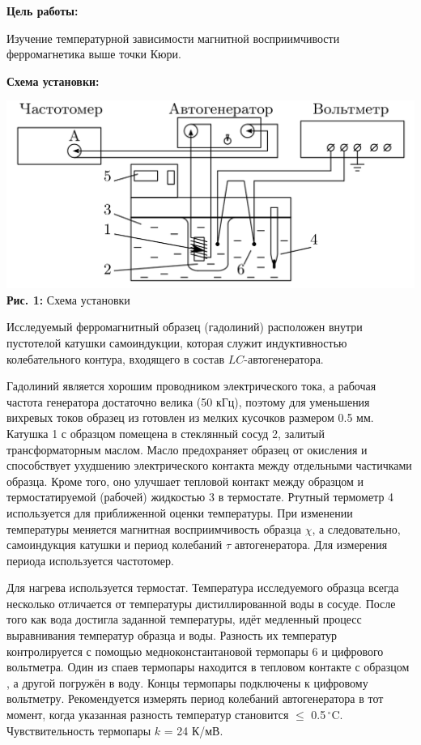 \documentclass[12pt,a4paper]{scrartcl}
\begin{document}
	\textbf{Цель работы: }
	
	Изучение температурной зависимости магнитной восприимчивости ферромагнетика выше точки Кюри.
	
	\textbf{Схема установки:}
	\begin{center}
		\includegraphics[scale=0.32]{PIC_1}
		\\\textbf{Рис. 1:} Схема установки
	\end{center}	
		
	Исследуемый ферромагнитный образец (гадолиний) расположен внутри пустотелой катушки самоиндукции, которая служит индуктивностью колебательного контура, входящего в состав $LC$-автогенератора.
	
	Гадолиний является хорошим проводником электрического тока, а рабочая частота генератора достаточно велика (50 кГц), поэтому для уменьшения вихревых токов образец из готовлен
	из мелких кусочков размером 0.5 мм. Катушка 1 с образцом помещена в стеклянный сосуд 2,
	залитый трансформаторным маслом. Масло предохраняет образец от окисления и способствует ухудшению электрического контакта между отдельными частичками образца. Кроме того,
	оно улучшает тепловой контакт между образцом и термостатируемой (рабочей) жидкостью 3 в
	термостате. Ртутный термометр 4 используется для приближенной оценки температуры. При
	изменении температуры меняется магнитная восприимчивость образца $\chi$, а следовательно, самоиндукция катушки и период колебаний $\tau$ автогенератора. Для измерения периода используется частотомер.
	
	Для нагрева используется термостат. Температура исследуемого образца всегда несколько
	отличается от температуры дистиллированной воды в сосуде. После того как вода достигла
	заданной температуры, идёт медленный процесс выравнивания температур образца и воды.
	Разность их температур контролируется с помощью медноконстантановой термопары 6 и цифрового вольтметра. Один из спаев термопары находится в тепловом контакте с образцом , а другой погружён в воду. Концы термопары подключены к цифровому вольтметру. Рекомендуется измерять период колебаний автогенератора в тот момент, когда указанная разность
	температур становится $\leqslant$ 0.5$\, ^\circ \mathrm{C}$. Чувствительность термопары $k$ = 24 К/мВ.
		
\end{document}
